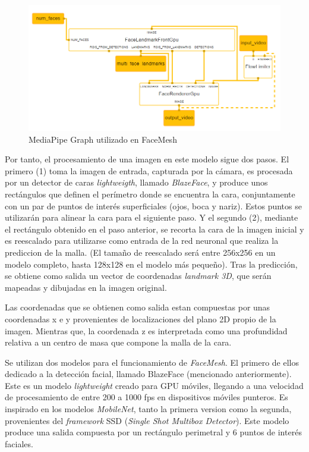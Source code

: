 \begin{figure}[htp]
	\centering
	\includegraphics[width=15cm]{imagenes/faceMesh.png}
	\caption{MediaPipe Graph utilizado en FaceMesh}
	\label{fig:faceMesh}
\end{figure}

Por tanto, el procesamiento de una imagen en este modelo sigue dos pasos. El primero (1) toma la imagen de entrada, capturada por la cámara, es procesada por un detector de caras \textit{lightweigth}, llamado \textit{BlazeFace}, y produce unos rectángulos que definen el perímetro donde se encuentra la cara, conjuntamente con un par de puntos de interés superficiales (ojos, boca y nariz). Estos puntos se utilizarán para alinear la cara para el siguiente paso. Y el segundo (2), mediante el rectángulo obtenido en el paso anterior, se recorta la cara de la imagen inicial y es reescalado para utilizarse como entrada de la red neuronal que realiza la prediccion de la malla. (El tamaño de reescalado será entre 256x256 en un modelo completo, hasta 128x128 en el modelo más pequeño). Tras la predicción, se obtiene como salida un vector de coordenadas \textit{landmark 3D}, que serán mapeadas y dibujadas en la imagen original. \cite{faceMesh2}

Las coordenadas que se obtienen como salida estan compuestas por unas coordenadas x e y provenientes de localizaciones del plano 2D propio de la imagen. Mientras que, la coordenada z es interpretada como una profundidad relativa a un centro de masa que compone la malla de la cara.

Se utilizan dos modelos para el funcionamiento de \textit{FaceMesh}. El primero de ellos dedicado a la detección facial, llamado BlazeFace (mencionado anteriormente). Este es un modelo \textit{lightweight} creado para GPU móviles, llegando a una velocidad de procesamiento de entre 200 a 1000 fps en dispositivos móviles punteros. Es inspirado en los modelos \textit{MobileNet}, tanto la primera version como la segunda, provenientes del \textit{framework} SSD (\textit{Single Shot Multibox Detector}). Este modelo produce una salida compuesta por un rectángulo perimetral y 6 puntos de interés faciales. \cite{blazeface}

